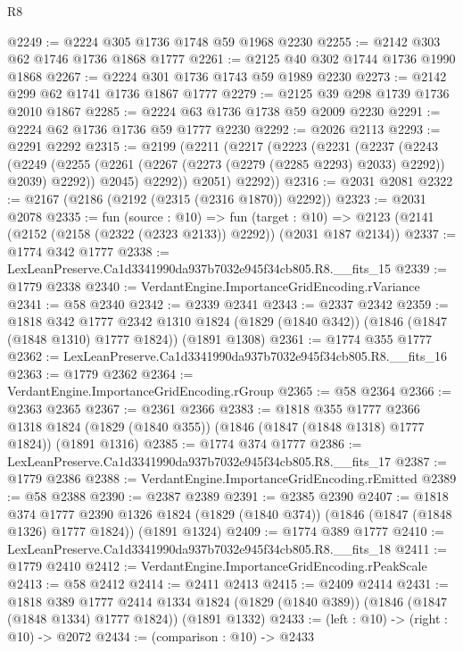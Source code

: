 \begin{lexlean}{R8}
\begin{coremodule}
@2249 := @2224 @305 @1736 @1748 @59 @1968 @2230
@2255 := @2142 @303 @62 @1746 @1736 @1868 @1777
@2261 := @2125 @40 @302 @1744 @1736 @1990 @1868
@2267 := @2224 @301 @1736 @1743 @59 @1989 @2230
@2273 := @2142 @299 @62 @1741 @1736 @1867 @1777
@2279 := @2125 @39 @298 @1739 @1736 @2010 @1867
@2285 := @2224 @63 @1736 @1738 @59 @2009 @2230
@2291 := @2224 @62 @1736 @1736 @59 @1777 @2230
@2292 := @2026 @2113
@2293 := @2291 @2292
@2315 := @2199
    (@2211
      (@2217
        (@2223
          (@2231
            (@2237
              (@2243
                (@2249
                  (@2255 (@2261 (@2267 (@2273 (@2279 (@2285 @2293) @2033) @2292)) @2039) @2292))
                @2045)
              @2292))
          @2051)
        @2292))
@2316 := @2031 @2081
@2322 := @2167 (@2186 (@2192 (@2315 (@2316 @1870)) @2292))
@2323 := @2031 @2078
@2335 := fun (source : @10) =>
  fun (target : @10) => @2123 (@2141 (@2152 (@2158 (@2322 (@2323 @2133)) @2292)) (@2031 @187 @2134))
@2337 := @1774 @342 @1777
@2338 := LexLeanPreserve.Ca1d3341990da937b7032e945f34cb805.R8.__fits_15
@2339 := @1779 @2338
@2340 := VerdantEngine.ImportanceGridEncoding.rVariance
@2341 := @58 @2340
@2342 := @2339 @2341
@2343 := @2337 @2342
@2359 := @1818
    @342
    @1777
    @2342
    @1310
    @1824
    (@1829 (@1840 @342))
    (@1846 (@1847 (@1848 @1310) @1777 @1824))
    (@1891 @1308)
@2361 := @1774 @355 @1777
@2362 := LexLeanPreserve.Ca1d3341990da937b7032e945f34cb805.R8.__fits_16
@2363 := @1779 @2362
@2364 := VerdantEngine.ImportanceGridEncoding.rGroup
@2365 := @58 @2364
@2366 := @2363 @2365
@2367 := @2361 @2366
@2383 := @1818
    @355
    @1777
    @2366
    @1318
    @1824
    (@1829 (@1840 @355))
    (@1846 (@1847 (@1848 @1318) @1777 @1824))
    (@1891 @1316)
@2385 := @1774 @374 @1777
@2386 := LexLeanPreserve.Ca1d3341990da937b7032e945f34cb805.R8.__fits_17
@2387 := @1779 @2386
@2388 := VerdantEngine.ImportanceGridEncoding.rEmitted
@2389 := @58 @2388
@2390 := @2387 @2389
@2391 := @2385 @2390
@2407 := @1818
    @374
    @1777
    @2390
    @1326
    @1824
    (@1829 (@1840 @374))
    (@1846 (@1847 (@1848 @1326) @1777 @1824))
    (@1891 @1324)
@2409 := @1774 @389 @1777
@2410 := LexLeanPreserve.Ca1d3341990da937b7032e945f34cb805.R8.__fits_18
@2411 := @1779 @2410
@2412 := VerdantEngine.ImportanceGridEncoding.rPeakScale
@2413 := @58 @2412
@2414 := @2411 @2413
@2415 := @2409 @2414
@2431 := @1818
    @389
    @1777
    @2414
    @1334
    @1824
    (@1829 (@1840 @389))
    (@1846 (@1847 (@1848 @1334) @1777 @1824))
    (@1891 @1332)
@2433 := (left : @10) -> (right : @10) -> @2072
@2434 := (comparison : @10) -> @2433

\end{coremodule}
\end{lexlean}
